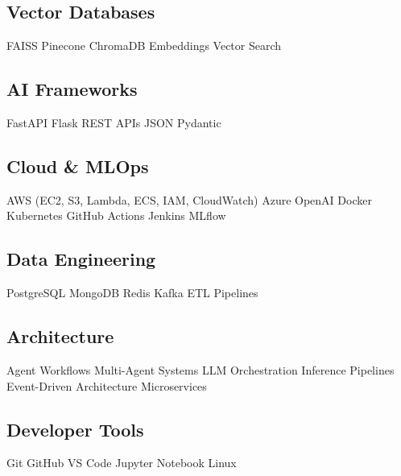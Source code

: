 \documentclass[letterpaper]{deedy-resume} %
\begin{document}
\begin{minipage}[t]{0.33\textwidth}
\subsection{Vector Databases}
FAISS \textbullet{} Pinecone \textbullet{} ChromaDB \textbullet{} Embeddings \textbullet{} Vector Search

\subsection{AI Frameworks}
FastAPI \textbullet{} Flask \textbullet{} REST APIs \textbullet{} JSON \textbullet{} Pydantic

\subsection{Cloud \& MLOps}
AWS (EC2, S3, Lambda, ECS, IAM, CloudWatch) \textbullet{} Azure OpenAI \textbullet{} Docker \textbullet{} Kubernetes \textbullet{} GitHub Actions \textbullet{} Jenkins \textbullet{} MLflow

\subsection{Data Engineering}
PostgreSQL \textbullet{} MongoDB \textbullet{} Redis \textbullet{} Kafka \textbullet{} ETL Pipelines

\subsection{Architecture}
Agent Workflows \textbullet{} Multi-Agent Systems \textbullet{} LLM Orchestration \textbullet{} Inference Pipelines \textbullet{} Event-Driven Architecture \textbullet{} Microservices

\subsection{Developer Tools}
Git \textbullet{} GitHub \textbullet{} VS Code \textbullet{} Jupyter Notebook \textbullet{} Linux
\sectionspace


\sectionspace %

\sectionspace %


\end{minipage} %
\end{document}
